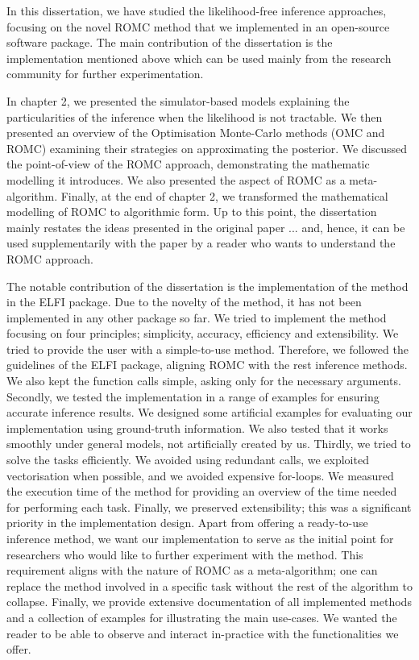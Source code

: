 In this dissertation, we have studied the likelihood-free inference approaches, focusing on the novel ROMC method that we implemented in an open-source software package. The main contribution of the dissertation is the implementation mentioned above which can be used mainly from the research community for further experimentation.

In chapter 2, we presented the simulator-based models explaining the particularities of the inference when the likelihood is not tractable. We then presented an overview of the Optimisation Monte-Carlo methods (OMC and ROMC) examining their strategies on approximating the posterior. We discussed the point-of-view of the ROMC approach, demonstrating the mathematic modelling it introduces. We also presented the aspect of ROMC as a meta-algorithm. Finally, at the end of chapter 2, we transformed the mathematical modelling of ROMC to algorithmic form. Up to this point, the dissertation mainly restates the ideas presented in the original paper ... and, hence, it can be used supplementarily with the paper by a reader who wants to understand the ROMC approach.

The notable contribution of the dissertation is the implementation of the method in the ELFI package. Due to the novelty of the method, it has not been implemented in any other package so far. We tried to implement the method focusing on four principles; simplicity, accuracy, efficiency and extensibility. We tried to provide the user with a simple-to-use method. Therefore, we followed the guidelines of the ELFI package, aligning ROMC with the rest inference methods. We also kept the function calls simple, asking only for the necessary arguments. Secondly, we tested the implementation in a range of examples for ensuring accurate inference results. We designed some artificial examples for evaluating our implementation using ground-truth information. We also tested that it works smoothly under general models, not artificially created by us. Thirdly, we tried to solve the tasks efficiently. We avoided using redundant calls, we exploited vectorisation when possible, and we avoided expensive for-loops.  We measured the execution time of the method for providing an overview of the time needed for performing each task. Finally, we preserved extensibility; this was a significant priority in the implementation design. Apart from offering a ready-to-use inference method, we want our implementation to serve as the initial point for researchers who would like to further experiment with the method. This requirement aligns with the nature of ROMC as a meta-algorithm; one can replace the method involved in a specific task without the rest of the algorithm to collapse. Finally, we provide extensive documentation of all implemented methods and a  collection of examples for illustrating the main use-cases. We wanted the reader to be able to observe and interact in-practice with the functionalities we offer.